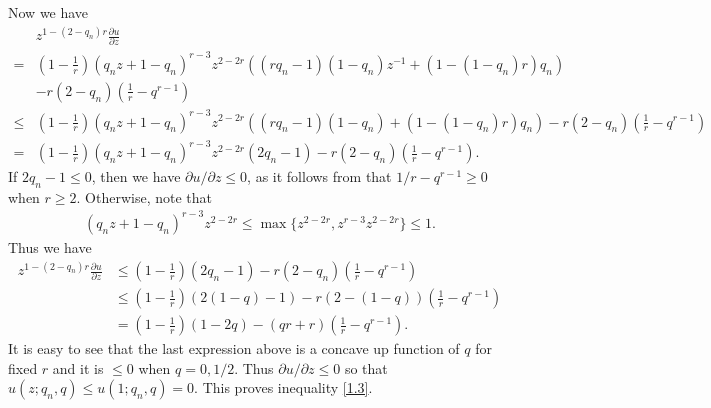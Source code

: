 \documentclass[11pt]{amsart}
\numberwithin{equation}{section}
\theoremstyle{definition}
\theoremstyle{remark}
\begin{document}
   Now we have
\begin{align*}
   &z^{1-(2-q_n)r} \frac {\partial u}{\partial
    z} \\
   =&
   (1-\frac {1}{r})(q_nz+1-q_n)^{r-3}z^{2-2r}\left (
   \left(rq_n-1 \right )(1-q_n)z^{-1}+\left(1-(1-q_n)r \right )q_n
   \right ) \\
   &-r(2-q_n)(\frac 1r-q^{r-1}) \\
    \leq & (1-\frac {1}{r})(q_nz+1-q_n)^{r-3}z^{2-2r}\left (
   \left(rq_n-1 \right )(1-q_n)+\left(1-(1-q_n)r \right )q_n
   \right ) -r(2-q_n)(\frac 1r-q^{r-1})  \\
   =& (1-\frac {1}{r})(q_nz+1-q_n)^{r-3}z^{2-2r}\left (2q_n-1
   \right )
   -r(2-q_n)(\frac 1r-q^{r-1}).
\end{align*}
    If $2q_n-1\leq 0$, then we have $\partial u/\partial
    z  \leq 0$, as it follows from \cite[(2.1)]{G5} that $1/r-q^{r-1} \geq 0$ when $r \geq 2$. Otherwise, note
    that
\begin{align*}
    (q_nz+1-q_n)^{r-3}z^{2-2r} \leq \max \{z^{2-2r}, z^{r-3}z^{2-2r}
    \} \leq 1.
\end{align*}
   Thus we have
\begin{align*}
   z^{1-(2-q_n)r} \frac {\partial u}{\partial
    z}  &\leq (1-\frac {1}{r})\left (2q_n-1
   \right )
   -r(2-q_n)(\frac 1r-q^{r-1})  \\
   &\leq (1-\frac {1}{r})\left (2(1-q)-1
   \right )
   -r(2-(1-q))(\frac 1r-q^{r-1}) \\
   & =  (1-\frac {1}{r})\left (1-2q \right )
   -(qr+r)\left (\frac 1r-q^{r-1} \right).
\end{align*}
   It is easy to see that the last expression above is a concave up function of $q$
   for fixed $r$ and it is $ \leq 0$ when $q=0, 1/2$. Thus $\partial u/\partial
    z \leq 0$ so that $u(z; q_n, q) \leq u(1;q_n,q)=0$. This proves inequality \eqref{1.3}.
\end{document}
